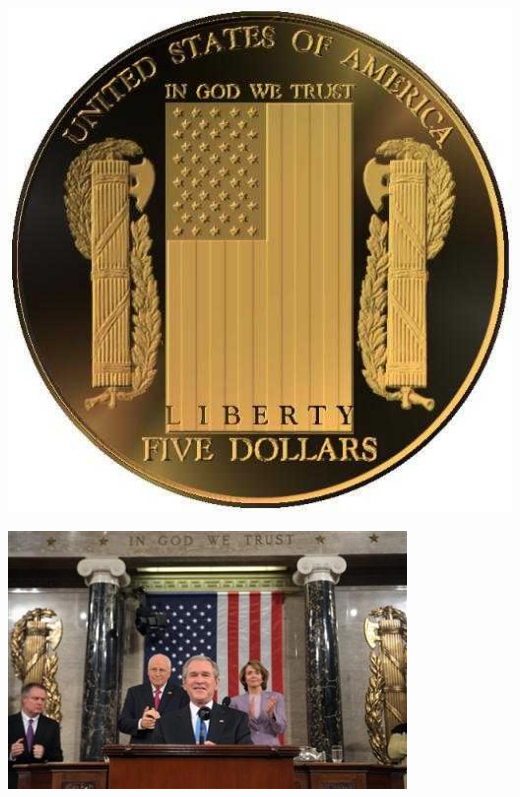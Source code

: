 \begin{frame}
    \centering
    \includegraphics[width=.9\textwidth]{img/fasces/fasces5coin.jpg} \\
\end{frame}
\begin{frame}
    \centering
    \includegraphics[width=.9\textwidth]{img/fasces/fasces_congress.jpg} \\
\end{frame}

